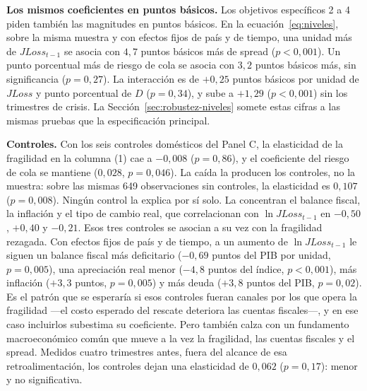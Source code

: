 \textbf{Los mismos coeficientes en puntos básicos.} Los objetivos específicos 2 a 4 piden también las magnitudes en puntos básicos. En la ecuación~\eqref{eq:niveles}, sobre la misma muestra y con efectos fijos de país y de tiempo, una unidad más de $JLoss_{t-1}$ se asocia con $4{,}7$ puntos básicos más de spread ($p<0{,}001$). Un punto porcentual más de riesgo de cola se asocia con $3{,}2$ puntos básicos más, sin significancia ($p=0{,}27$). La interacción es de $+0{,}25$ puntos básicos por unidad de $JLoss$ y punto porcentual de $D$ ($p=0{,}34$), y sube a $+1{,}29$ ($p<0{,}001$) sin los trimestres de crisis. La Sección~\ref{sec:robustez-niveles} somete estas cifras a las mismas pruebas que la especificación principal.

\textbf{Controles.} Con los seis controles domésticos del Panel C, la elasticidad de la fragilidad en la columna (1) cae a $-0{,}008$ ($p=0{,}86$), y el coeficiente del riesgo de cola se mantiene ($0{,}028$, $p=0{,}046$). La caída la producen los controles, no la muestra: sobre las mismas 649 observaciones sin controles, la elasticidad es $0{,}107$ ($p=0{,}008$). Ningún control la explica por sí solo. La concentran el balance fiscal, la inflación y el tipo de cambio real, que correlacionan con $\ln JLoss_{t-1}$ en $-0{,}50$, $+0{,}40$ y $-0{,}21$. Esos tres controles se asocian a su vez con la fragilidad rezagada. Con efectos fijos de país y de tiempo, a un aumento de $\ln JLoss_{t-1}$ le siguen un balance fiscal más deficitario ($-0{,}69$ puntos del PIB por unidad, $p=0{,}005$), una apreciación real menor ($-4{,}8$ puntos del índice, $p<0{,}001$), más inflación ($+3{,}3$ puntos, $p=0{,}005$) y más deuda ($+3{,}8$ puntos del PIB, $p=0{,}02$). Es el patrón que se esperaría si esos controles fueran canales por los que opera la fragilidad ---el costo esperado del rescate deteriora las cuentas fiscales---, y en ese caso incluirlos subestima su coeficiente. Pero también calza con un fundamento macroeconómico común que mueve a la vez la fragilidad, las cuentas fiscales y el spread. Medidos cuatro trimestres antes, fuera del alcance de esa retroalimentación, los controles dejan una elasticidad de $0{,}062$ ($p=0{,}17$): menor y no significativa.

